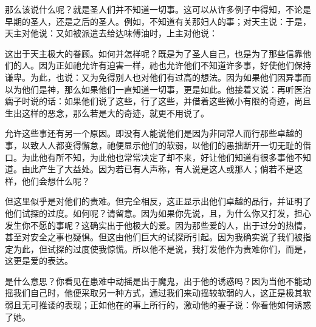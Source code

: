 那么该说什么呢？就是圣人们并不知道一切事。这可以从许多例子中得知，不论是早期的圣人，还是之后的圣人。例如，不知道有关那妇人的事；对天主说：于是，天主对他说：又如被派遣去给达味傅油时，上主对他说：\par

这出于天主极大的眷顾。如何并怎样呢？既是为了圣人自己，也是为了那些信靠他们的人。因为正如祂允许有迫害一样，祂也允许他们不知道许多事，好使他们保持谦卑。为此，也说：又为免得别人也对他们有过高的想法。因为如果他们因异事而以为他们是神，那么如果他们一直知道一切事，更是如此。他接着又说：再听医治瘸子时说的话：如果他们说了这些，行了这些，并借着这些微小有限的奇迹，尚且生出这样的恶念，那么若是大的奇迹，就更不用说了。\par

允许这些事还有另一个原因。即没有人能说他们是因为非同常人而行那些卓越的事，以致人人都变得懈怠，祂便显示他们的软弱，以他们的愚拙断开一切无耻的借口。为此他有所不知，为此他也常常决定了却不来，好让他们知道有很多事他不知道。由此产生了大益处。因为若已有人声称，有人说是这人或那人；倘若不是这样，他们会想什么呢？\par

但这里似乎是对他们的责难。但完全相反，这正显示出他们卓越的品行，并证明了他们试探的过度。如何呢？请留意。因为如果你先说，且，为什么你又打发，担心发生你不愿的事呢？这确实出于他极大的爱。因为那些爱的人，出于过分的热情，甚至对安全之事也疑惧。但这由他们巨大的试探所引起。因为我确实说了我们被指定为此，但试探的过度使我惊慌。所以他不是说，我打发他作为责难你们，而是，这更是爱的表达。\par

是什么意思？你看见在患难中动摇是出于魔鬼，出于他的诱惑吗？因为当他不能动摇我们自己时，他便采取另一种方式，通过我们来动摇较软弱的人，这正是极其软弱且无可推诿的表现；正如他在的事上所行的，激动他的妻子说：你看他如何诱惑了她。\par

